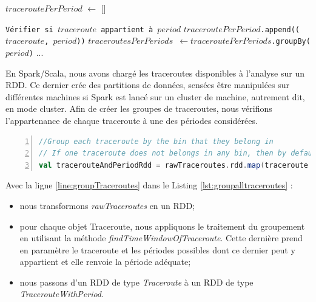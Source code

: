 \begin{algorithm}[H]
	\caption{Groupement des traceroutes en Spark}
	\label{group-data-sparkscala}
	\begin{algorithmic}[1]
    \State $ traceroutePerPeriod $  $\gets$ [] \label{initate-list}
	
			\State \texttt{Vérifier si  $traceroute$ appartient à  $period$}
		\EndFor
		\State \texttt{$ traceroutePerPeriod $.append(($ traceroute $, $period$))}
	\EndFor  \label{finloop1}
	\State \texttt{$ traceroutesPerPeriods $ $\gets$$ traceroutePerPeriods $.groupBy($period$)} \label{groupby}
	\label{begin-groupby}
	\State ... 
	\EndFor \label{end-groupby}

\end{algorithmic}
\end{algorithm}

En Spark/Scala, nous avons chargé les traceroutes disponibles à l'analyse sur un RDD. Ce dernier crée des partitions de données, sensées être manipulées sur différentes machines si Spark est lancé sur un cluster de machine, autrement dit, en mode cluster. Afin de créer les groupes de traceroutes, nous vérifions l'appartenance de chaque traceroute à une des périodes considérées.

\begin{lstlisting}[language=scala,firstnumber=1, caption={},label={lst:groupalltraceroutes}, basicstyle = \small,escapechar=|,numbers=left,
stepnumber=1]
//Group each traceroute by the bin that they belong in 
// If one traceroute does not belongs in any bin, then by default it belongs to the bin 0
val tracerouteAndPeriodRdd = rawTraceroutes.rdd.map(traceroute => TracerouteWithTimewindow(traceroute, findTimeWindowOfTraceroute(traceroute, rangeDatesTimewindows)))|\label{line:groupTraceroutes}|
\end{lstlisting}

Avec la ligne \ref{line:groupTraceroutes} dans le Listing \ref{lst:groupalltraceroutes} :

\begin{itemize}
	\item nous transformons  \textit{rawTraceroutes}  en un RDD;
	\item pour chaque objet Traceroute, nous appliquons le traitement du groupement en utilisant la méthode \textit{findTimeWindowOfTraceroute}. Cette dernière prend en paramètre le traceroute et les périodes possibles dont ce dernier peut y appartient et elle renvoie la période adéquate;
	\item nous passons d'un RDD de type \textit{Traceroute} à un RDD de type \textit{TracerouteWithPeriod}.
\end{itemize}


